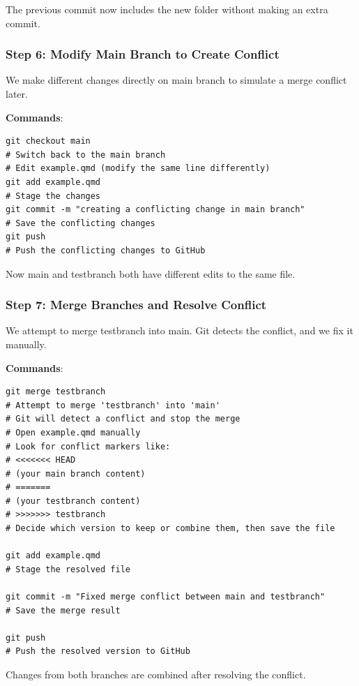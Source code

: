 \documentclass[
  11pt,
  a4paper,
]{article}
\begin{document}
The previous commit now includes the new folder without making an extra
commit. \newpage

\subsubsection{Step 6: Modify Main Branch to Create
Conflict}\label{step-6-modify-main-branch-to-create-conflict}

We make different changes directly on main branch to simulate a merge
conflict later.

\textbf{Commands}:

\begin{verbatim}
git checkout main
# Switch back to the main branch
# Edit example.qmd (modify the same line differently)
git add example.qmd
# Stage the changes
git commit -m "creating a conflicting change in main branch"
# Save the conflicting changes
git push
# Push the conflicting changes to GitHub
\end{verbatim}

Now main and testbranch both have different edits to the same file.
\newpage

\subsubsection{Step 7: Merge Branches and Resolve
Conflict}\label{step-7-merge-branches-and-resolve-conflict}

We attempt to merge testbranch into main. Git detects the conflict, and
we fix it manually.

\textbf{Commands}:

\begin{verbatim}
git merge testbranch
# Attempt to merge 'testbranch' into 'main'
# Git will detect a conflict and stop the merge
# Open example.qmd manually
# Look for conflict markers like:
# <<<<<<< HEAD
# (your main branch content)
# =======
# (your testbranch content)
# >>>>>>> testbranch
# Decide which version to keep or combine them, then save the file

git add example.qmd
# Stage the resolved file

git commit -m "Fixed merge conflict between main and testbranch"
# Save the merge result

git push
# Push the resolved version to GitHub
\end{verbatim}

Changes from both branches are combined after resolving the conflict.
\newpage
\end{document}
